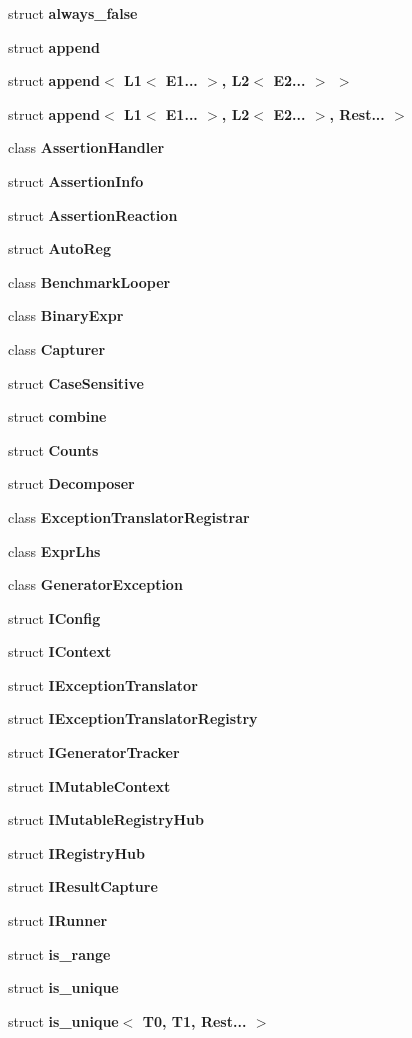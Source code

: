 \begin{DoxyCompactItemize}
\item 
struct \textbf{ always\+\_\+false}
\item 
struct \textbf{ append}
\item 
struct \textbf{ append$<$ L1$<$ E1... $>$, L2$<$ E2... $>$ $>$}
\item 
struct \textbf{ append$<$ L1$<$ E1... $>$, L2$<$ E2... $>$, Rest... $>$}
\item 
class \textbf{ Assertion\+Handler}
\item 
struct \textbf{ Assertion\+Info}
\item 
struct \textbf{ Assertion\+Reaction}
\item 
struct \textbf{ Auto\+Reg}
\item 
class \textbf{ Benchmark\+Looper}
\item 
class \textbf{ Binary\+Expr}
\item 
class \textbf{ Capturer}
\item 
struct \textbf{ Case\+Sensitive}
\item 
struct \textbf{ combine}
\item 
struct \textbf{ Counts}
\item 
struct \textbf{ Decomposer}
\item 
class \textbf{ Exception\+Translator\+Registrar}
\item 
class \textbf{ Expr\+Lhs}
\item 
class \textbf{ Generator\+Exception}
\item 
struct \textbf{ I\+Config}
\item 
struct \textbf{ I\+Context}
\item 
struct \textbf{ I\+Exception\+Translator}
\item 
struct \textbf{ I\+Exception\+Translator\+Registry}
\item 
struct \textbf{ I\+Generator\+Tracker}
\item 
struct \textbf{ I\+Mutable\+Context}
\item 
struct \textbf{ I\+Mutable\+Registry\+Hub}
\item 
struct \textbf{ I\+Registry\+Hub}
\item 
struct \textbf{ I\+Result\+Capture}
\item 
struct \textbf{ I\+Runner}
\item 
struct \textbf{ is\+\_\+range}
\item 
struct \textbf{ is\+\_\+unique}
\item 
struct \textbf{ is\+\_\+unique$<$ T0, T1, Rest... $>$}

\end{DoxyCompactItemize}
